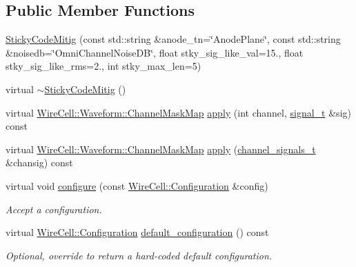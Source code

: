 \subsection*{Public Member Functions}
\begin{DoxyCompactItemize}
\item 
\hyperlink{class_wire_cell_1_1_sig_proc_1_1_protodune_1_1_sticky_code_mitig_ae8377478ef6da491ced84f14b87f2127}{Sticky\+Code\+Mitig} (const std\+::string \&anode\+\_\+tn=\char`\"{}Anode\+Plane\char`\"{}, const std\+::string \&noisedb=\char`\"{}Omni\+Channel\+Noise\+DB\char`\"{}, float stky\+\_\+sig\+\_\+like\+\_\+val=15., float stky\+\_\+sig\+\_\+like\+\_\+rms=2., int stky\+\_\+max\+\_\+len=5)
\item 
virtual \hyperlink{class_wire_cell_1_1_sig_proc_1_1_protodune_1_1_sticky_code_mitig_ad6d860f39562b48b523c376390a247e8}{$\sim$\+Sticky\+Code\+Mitig} ()
\item 
virtual \hyperlink{namespace_wire_cell_1_1_waveform_a18b9ae61c858e340252ba3ac83ac3bc0}{Wire\+Cell\+::\+Waveform\+::\+Channel\+Mask\+Map} \hyperlink{class_wire_cell_1_1_sig_proc_1_1_protodune_1_1_sticky_code_mitig_a158d7c7d804ad6548383fedba2d3f115}{apply} (int channel, \hyperlink{class_wire_cell_1_1_i_channel_filter_a434ed96cc4b805fa0eeec14f9f8d85e9}{signal\+\_\+t} \&sig) const
\item 
virtual \hyperlink{namespace_wire_cell_1_1_waveform_a18b9ae61c858e340252ba3ac83ac3bc0}{Wire\+Cell\+::\+Waveform\+::\+Channel\+Mask\+Map} \hyperlink{class_wire_cell_1_1_sig_proc_1_1_protodune_1_1_sticky_code_mitig_a59d9c2567caa4f84b0e1a2cba57c0b6d}{apply} (\hyperlink{class_wire_cell_1_1_i_channel_filter_a44de35ce47701d84cd45393c6bcd5e2f}{channel\+\_\+signals\+\_\+t} \&chansig) const
\item 
virtual void \hyperlink{class_wire_cell_1_1_sig_proc_1_1_protodune_1_1_sticky_code_mitig_a26422e4f93a396fa3e72809377ed4567}{configure} (const \hyperlink{namespace_wire_cell_a9f705541fc1d46c608b3d32c182333ee}{Wire\+Cell\+::\+Configuration} \&config)
\begin{DoxyCompactList}\small\item\em Accept a configuration. \end{DoxyCompactList}\item 
virtual \hyperlink{namespace_wire_cell_a9f705541fc1d46c608b3d32c182333ee}{Wire\+Cell\+::\+Configuration} \hyperlink{class_wire_cell_1_1_sig_proc_1_1_protodune_1_1_sticky_code_mitig_aa42dce81ba4e7dad67cc5653c9a8249f}{default\+\_\+configuration} () const
\begin{DoxyCompactList}\small\item\em Optional, override to return a hard-\/coded default configuration. \end{DoxyCompactList}\end{DoxyCompactItemize}
